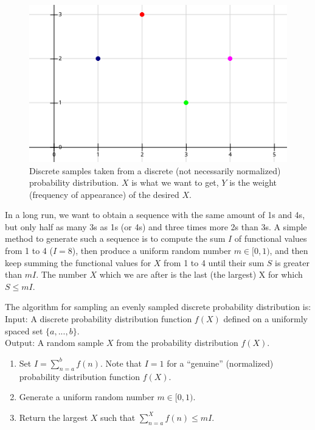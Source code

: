 \documentclass[12pt, letterpaper]{article}
\begin{document}
\begin{figure}[H]
\centering 
\includegraphics[scale=0.8]{Samples.png}
\caption{Discrete samples taken from a discrete (not necessarily normalized) probability distribution. $X$ is what we want to get, $Y$ is the weight (frequency of appearance) of the desired $X$.}
\end{figure}

In a long run, we want to obtain a sequence with the same amount of 1s and 4s, but only half as many 3s as 1s (or 4s) and three times more 2s than 3s. A simple method to generate such a sequence is to compute the sum $I$ of functional values  from 1 to 4 ($I=8$), then produce a uniform random number $m\in [0,1)$, and then keep summing the functional values for $X$ from 1 to 4 until their sum $S$ is greater than $mI$. The number $X$ which we are after is the last (the largest) X for which $S\le mI$. 

The algorithm for sampling an evenly sampled discrete probability distribution is:\\
Input: A discrete probability distribution function $f(X)$ defined on a uniformly spaced set $\{a,...,b\}$.\\
Output: A random sample $X$ from the probability distribution $f(X)$.
\begin{enumerate}
\item Set $I = \sum_{n=a}^{b}f(n)$. Note that  $I=1$ for a ``genuine'' (normalized) probability distribution function $f(X)$.
\item Generate a uniform random number $m\in [0, 1)$.
\item Return the largest $X$ such that $\sum_{n=a}^{X}f(n) \le mI$.
\end{enumerate}
\end{document}

